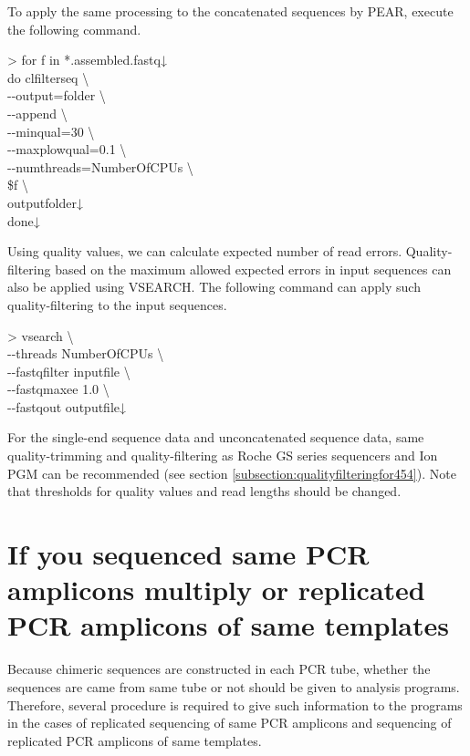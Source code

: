 \documentclass[titlepage,10pt,a4paper,english]{jsbook}
\newenvironment{cmd}{\begin{oframed}\raggedright\ttfamily\footnotesize\setlength{\baselineskip}{1.4em}}{\end{oframed}\vspace{-1em}}
\begin{document}
To apply the same processing to the concatenated sequences by PEAR, execute the following command.

\begin{cmd}
{\textgreater} for f in *.assembled.fastq↓\\
do clfilterseq {\textbackslash}\\
{-}{-}output=folder {\textbackslash}\\
{-}{-}append {\textbackslash}\\
{-}{-}minqual=30 {\textbackslash}\\
{-}{-}maxplowqual=0.1 {\textbackslash}\\
{-}{-}numthreads=NumberOfCPUs {\textbackslash}\\
\$f {\textbackslash}\\
outputfolder↓\\
done↓
\end{cmd}

Using quality values, we can calculate expected number of read errors.
Quality-filtering based on the maximum allowed expected errors in input sequences can also be applied using VSEARCH.
The following command can apply such quality-filtering to the input sequences.

\begin{cmd}
{\textgreater} vsearch {\textbackslash}\\
{-}{-}threads NumberOfCPUs {\textbackslash}\\
{-}{-}fastq{\textunderscore}filter inputfile {\textbackslash}\\
{-}{-}fastq{\textunderscore}maxee 1.0 {\textbackslash}\\
{-}{-}fastqout outputfile↓
\end{cmd}

For the single-end sequence data and unconcatenated sequence data, same quality-trimming and quality-filtering as Roche GS series sequencers and Ion PGM can be recommended (see section \ref{subsection:qualityfilteringfor454}).
Note that thresholds for quality values and read lengths should be changed.

\section{If you sequenced same PCR amplicons multiply or replicated PCR amplicons of same templates}

Because chimeric sequences are constructed in each PCR tube, whether the sequences are came from same tube or not should be given to analysis programs.
Therefore, several procedure is required to give such information to the programs in the cases of replicated sequencing of same PCR amplicons and sequencing of replicated PCR amplicons of same templates.
\end{document}
